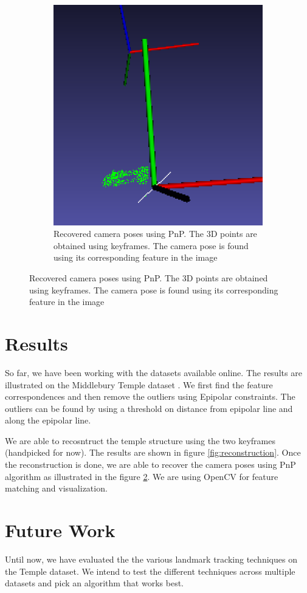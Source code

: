 \documentclass[12pt,twocolumn,letterpaper]{article}
\begin{document}
\begin{figure}
\begin{subfigure}{.3\textwidth}
        \includegraphics[width=.7\textwidth]{images/camera_pose}
        \caption{Recovered camera poses using PnP. The 3D points are obtained using keyframes. The camera pose is found using its corresponding feature in the image}
        \label{fig:pose}
    \end{subfigure}
\end{figure}



\section{Results}
So far, we have been working with the datasets available online. The results are illustrated on the Middlebury Temple dataset \cite{middlebury}. We first find the feature correspondences and then remove the outliers using Epipolar constraints. The outliers can be found by using a threshold on distance from epipolar line and along the epipolar line.

We are able to recosntruct the temple structure using the two keyframes (handpicked for now). The results are shown in figure \ref{fig:reconstruction}. Once the reconstruction is done, we are able to recover the camera poses using PnP algorithm as illustrated in the figure \ref{fig:pose}. We are using OpenCV for feature matching and visualization.


\section{Future Work}
Until now, we have evaluated the the various landmark tracking techniques on the Temple dataset. We intend to test the different techniques across multiple datasets and pick an algorithm that works best.
\end{document}
